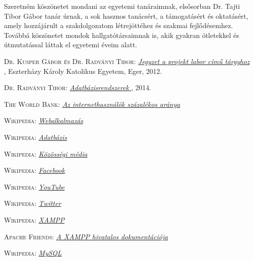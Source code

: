 \documentclass[
]{thesis-ekf}
\theoremstyle{definition}
\theoremstyle{remark}
\begin{document}
Szeretném köszönetet mondani az egyetemi tanáraimnak, elsősorban Dr. Tajti Tibor Gábor tanár úrnak, a sok hasznos tanácsért, a támogatásért és oktatásért, amely hozzájárult a szakdolgozatom létrejöttéhez és szakmai fejlődésemhez. Továbbá köszönetet mondok hallgatótársaimnak is, akik gyakran ötletekkel és útmutatással láttak el egyetemi éveim alatt.

\begin{thebibliography}{2}
\textsc{Dr. Kusper Gábor és Dr. Radványi Tibor}: \href{https://aries.ektf.hu/~hz/pdf-tamop/pdf-xx/ProgTechJegyzet.1.1.6.pdf}
{
	\emph{Jegyzet a projekt labor című tárgyhoz}
}, Eszterházy Károly Katolikus Egyetem, Eger, 2012.

\textsc{Dr. Radványi Tibor}: \href{https://docplayer.hu/18547169-Adatbazisrendszerek-radvanyi-tibor.html}
{
	\emph{Adatbázisrendszerek}
}, 2014.

\textsc{The World Bank}: \href{https://data.worldbank.org/indicator/IT.NET.USER.ZS}
{
	\emph{Az internethasználók százalékos aránya}
}

\textsc{Wikipedia}: \href{https://en.wikipedia.org/wiki/Web_application}
{
	\emph{Webalkalmazás}
}

\textsc{Wikipedia}: \href{https://hu.wikipedia.org/wiki/Adatb%C3%A1zis}
{
	\emph{Adatbázis}
}

\textsc{Wikipedia}: \href{https://hu.wikipedia.org/wiki/K%C3%B6z%C3%B6ss%C3%A9gi_m%C3%A9dia}
{
	\emph{Közösségi média}
}

\textsc{Wikipedia}: \href{https://hu.wikipedia.org/wiki/Facebook}
{
	\emph{Facebook}
}

\textsc{Wikipedia}: \href{https://hu.wikipedia.org/wiki/Youtube}
{
	\emph{YouTube}
}

\textsc{Wikipedia}: \href{https://hu.wikipedia.org/wiki/Twitter}
{
	\emph{Twitter}
}

\textsc{Wikipedia}: \href{https://hu.wikipedia.org/wiki/XAMPP}
{
	\emph{XAMPP}
}

\textsc{Apache Friends}: \href{https://www.apachefriends.org/docs/}
{
	\emph{A XAMPP hivatalos dokumentációja}
}

\textsc{Wikipedia}: \href{https://hu.wikipedia.org/wiki/MySQL}
{
	\emph{MySQL}
}


\end{thebibliography}
\end{document}
